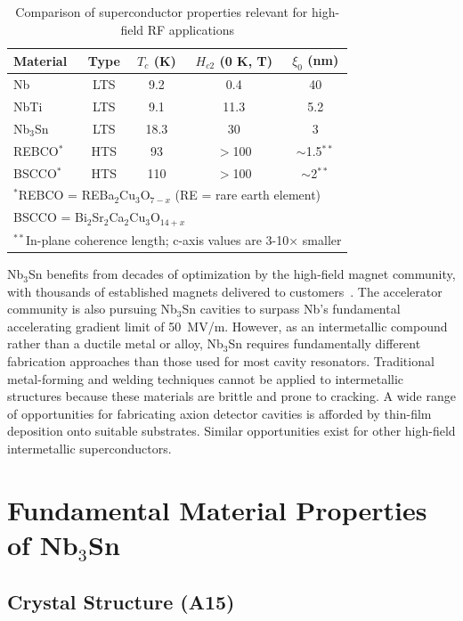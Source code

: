 \begin{table}[ht]
    \centering
    \caption{Comparison of superconductor properties relevant for high-field RF applications}
    \begin{tabular}{lcccc}
    \hline
    Material & Type & $T_c$ (K) & $H_{c2}$ (0 K, T) & $\xi_0$ (nm) \\
    \hline
    Nb & LTS & 9.2 & 0.4 & 40 \\
    NbTi & LTS & 9.1 & 11.3 & 5.2 \\
    Nb$_3$Sn & LTS & 18.3 & 30 & 3 \\
    REBCO$^*$ & HTS & 93 & $>$100 & $\sim$1.5$^{**}$ \\
    BSCCO$^*$ & HTS & 110 & $>$100 & $\sim$2$^{**}$ \\
    \hline
    \multicolumn{5}{l}{\small $^*$REBCO = REBa$_2$Cu$_3$O$_{7-x}$ (RE = rare earth element)} \\
    \multicolumn{5}{l}{\small \hspace{0.5em} BSCCO = Bi$_2$Sr$_2$Ca$_2$Cu$_3$O$_{14+x}$} \\
    \multicolumn{5}{l}{\small $^{**}$In-plane coherence length; c-axis values are 3-10× smaller}
     \end{tabular}
    \label{tab:SC_comparison}
\end{table}

Nb$_3$Sn benefits from decades of optimization by the high-field magnet community, with thousands of established magnets delivered to customers~\cite{cooleyBusinessModelsAssure2023}. The accelerator community is also pursuing Nb$_3$Sn cavities to surpass Nb's fundamental accelerating gradient limit of 50~MV/m. However, as an intermetallic compound rather than a ductile metal or alloy, Nb$_3$Sn requires fundamentally different fabrication approaches than those used for most cavity resonators. Traditional metal-forming and welding techniques cannot be applied to intermetallic structures because these materials are brittle and prone to cracking. A wide range of opportunities for fabricating axion detector cavities is afforded by thin-film deposition onto suitable substrates. Similar opportunities exist for other high-field intermetallic superconductors.

\section{Fundamental Material Properties of \texorpdfstring{Nb$_3$Sn}{Nb3Sn}}
 
    \subsection{Crystal Structure (A15)}

